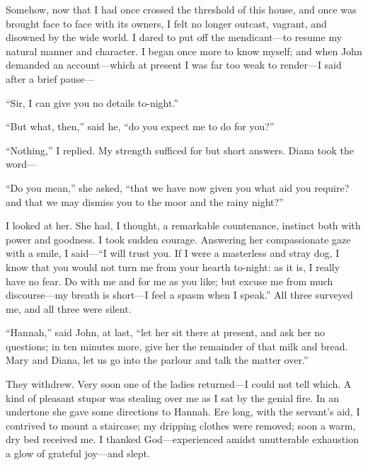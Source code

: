 Somehow, now that I had once crossed the threshold of this house, and
once was brought face to face with its owners, I felt no longer outcast,
vagrant, and disowned by the wide world. I dared to put off the
mendicant---to resume my natural manner and character. I began once
more to know myself; and when \Mr{} \St{} John demanded an account---which
at present I was far too weak to render---I said after a brief pause---

\enquote{Sir, I can give you no details to-night.}

\enquote{But what, then,} said he, \enquote{do you expect me to do for
you?}

\enquote{Nothing,} I replied. My strength sufficed for but short
answers. Diana took the word---

\enquote{Do you mean,} she asked, \enquote{that we have now given you
what aid you require? and that we may dismiss you to the moor and the
rainy night?}

I looked at her. She had, I thought, a remarkable countenance, instinct
both with power and goodness. I took sudden courage. Answering her
compassionate gaze with a smile, I said---\enquote{I will trust you. If
I were a masterless and stray dog, I know that you would not turn me
from your hearth to-night: as it is, I really have no fear. Do with me
and for me as you like; but excuse me from much discourse---my breath is
short---I feel a spasm when I speak.} All three surveyed me, and all
three were silent.

\enquote{Hannah,} said \Mr{} \St{} John, at last, \enquote{let her sit there
at present, and ask her no questions; in ten minutes more, give her the
remainder of that milk and bread. Mary and Diana, let us go into the
parlour and talk the matter over.}

They withdrew. Very soon one of the ladies returned---I could not tell
which. A kind of pleasant stupor was stealing over me as I sat by the
genial fire. In an undertone she gave some directions to Hannah. Ere
long, with the servant's aid, I contrived to mount a staircase; my
dripping clothes were removed; soon a warm, dry bed received me. I
thanked God---experienced amidst unutterable exhaustion a glow of
grateful joy---and slept.
